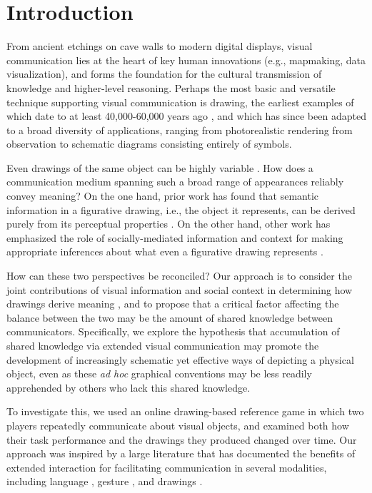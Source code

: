 \documentclass[10pt,letterpaper]{article}
\begin{document}
\section{Introduction}

From ancient etchings on cave walls to modern digital displays, visual communication lies at the heart of key human innovations (e.g., mapmaking, data visualization), and forms the foundation for the cultural transmission of knowledge and higher-level reasoning. 
Perhaps the most basic and versatile technique supporting visual communication is drawing, the earliest examples of which date to at least 40,000-60,000 years ago \cite{hoffmann2018u,Aubert:2014jy}, and which has since been adapted to a broad diversity of applications, ranging from photorealistic rendering from observation to schematic diagrams consisting entirely of symbols. 

Even drawings of the same object can be highly variable \cite{quickdraw2017}.
How does a communication medium spanning such a broad range of appearances reliably convey meaning? 
On the one hand, prior work has found that semantic information in a figurative drawing, i.e., the object it represents, can be derived purely from its perceptual properties \cite{FanCommon2018}. 
On the other hand, other work has emphasized the role of socially-mediated information and context for making appropriate inferences about what even a figurative drawing represents \cite{goodman1976languages,gombrich1969art}.

How can these two perspectives be reconciled? 
Our approach is to consider the joint contributions of visual information and social context in determining how drawings derive meaning \cite{fan2018modeling,abell2009canny}, and to propose that a critical factor affecting the balance between the two may be the amount of shared knowledge between communicators. 
Specifically, we explore the hypothesis that accumulation of shared knowledge via extended visual communication may promote the development of increasingly schematic yet effective ways of depicting a physical object, even as these \textit{ad hoc} graphical conventions may be less readily apprehended by others who lack this shared knowledge. 

To investigate this, we used an online drawing-based reference game in which two players repeatedly communicate about visual objects, and examined both how their task performance and the drawings they produced changed over time. 
Our approach was inspired by a large literature that has documented the benefits of extended interaction for facilitating communication in several modalities, including language \cite{ClarkWilkesGibbs86_ReferringCollaborative,HawkinsFrankGoodman17_ConventionFormation}, gesture \cite{goldin1996silence,fay2014creating}, and drawings \cite{garrod_foundations_2007,fay2010interactive}.
\end{document}
